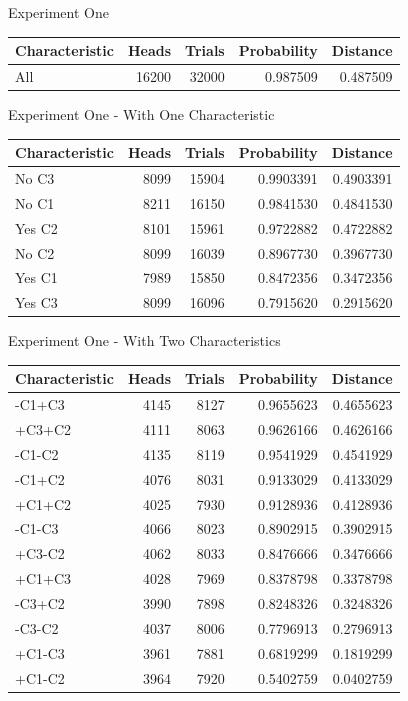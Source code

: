 \documentclass[
  ignorenonframetext,
]{beamer}
\renewcommand{\,}{\text{, }}
\begin{document}
\begin{frame}{Experiment One}
\protect\hypertarget{experiment-one}{}

\begin{longtable}[]{@{}lrrrr@{}}
\toprule
Characteristic & Heads & Trials & Probability & Distance\tabularnewline
\midrule
\endhead
All & 16200 & 32000 & 0.987509 & 0.487509\tabularnewline
\bottomrule
\end{longtable}

\end{frame}

\begin{frame}{Experiment One - With One Characteristic}
\protect\hypertarget{experiment-one---with-one-characteristic}{}

\begin{longtable}[]{@{}lrrrr@{}}
\toprule
Characteristic & Heads & Trials & Probability & Distance\tabularnewline
\midrule
\endhead
No C3 & 8099 & 15904 & 0.9903391 & 0.4903391\tabularnewline
No C1 & 8211 & 16150 & 0.9841530 & 0.4841530\tabularnewline
Yes C2 & 8101 & 15961 & 0.9722882 & 0.4722882\tabularnewline
No C2 & 8099 & 16039 & 0.8967730 & 0.3967730\tabularnewline
Yes C1 & 7989 & 15850 & 0.8472356 & 0.3472356\tabularnewline
Yes C3 & 8099 & 16096 & 0.7915620 & 0.2915620\tabularnewline
\bottomrule
\end{longtable}

\end{frame}

\begin{frame}{Experiment One - With Two Characteristics}
\protect\hypertarget{experiment-one---with-two-characteristics}{}

\begin{longtable}[]{@{}lrrrr@{}}
\toprule
Characteristic & Heads & Trials & Probability & Distance\tabularnewline
\midrule
\endhead
-C1+C3 & 4145 & 8127 & 0.9655623 & 0.4655623\tabularnewline
+C3+C2 & 4111 & 8063 & 0.9626166 & 0.4626166\tabularnewline
-C1-C2 & 4135 & 8119 & 0.9541929 & 0.4541929\tabularnewline
-C1+C2 & 4076 & 8031 & 0.9133029 & 0.4133029\tabularnewline
+C1+C2 & 4025 & 7930 & 0.9128936 & 0.4128936\tabularnewline
-C1-C3 & 4066 & 8023 & 0.8902915 & 0.3902915\tabularnewline
+C3-C2 & 4062 & 8033 & 0.8476666 & 0.3476666\tabularnewline
+C1+C3 & 4028 & 7969 & 0.8378798 & 0.3378798\tabularnewline
-C3+C2 & 3990 & 7898 & 0.8248326 & 0.3248326\tabularnewline
-C3-C2 & 4037 & 8006 & 0.7796913 & 0.2796913\tabularnewline
+C1-C3 & 3961 & 7881 & 0.6819299 & 0.1819299\tabularnewline
+C1-C2 & 3964 & 7920 & 0.5402759 & 0.0402759\tabularnewline
\bottomrule
\end{longtable}

\end{frame}
\end{document}

